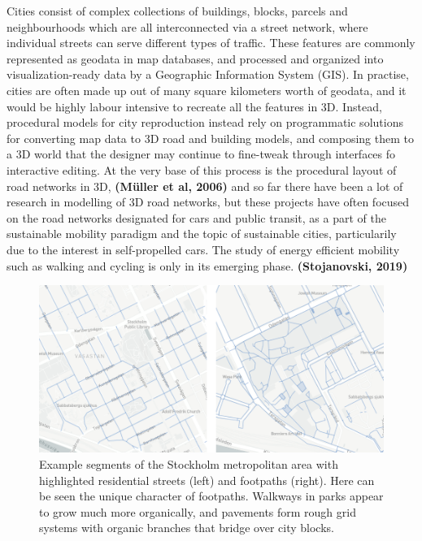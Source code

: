 \documentclass{kththesis}
\begin{document}
Cities consist of complex collections of buildings, blocks, parcels and neighbourhoods which are all interconnected via a street network, where individual streets can serve different types of traffic.
These features are commonly represented as geodata in map databases, and processed and organized into visualization-ready data by a Geographic Information System (GIS).
In practise, cities are often made up out of many square kilometers worth of geodata, and it would be highly labour intensive to recreate all the features in 3D.
Instead, procedural models for city reproduction instead rely on programmatic solutions for converting map data to 3D road and building models, and composing them to a 3D world that the designer may continue to fine-tweak through interfaces fo interactive editing.
At the very base of this process is the procedural layout of road networks in 3D,
\textbf{(Müller et al, 2006)}
and so far there have been a lot of research in modelling of 3D road networks, but these projects have often focused on the road networks designated for cars and public transit, as a part of the sustainable mobility paradigm and the topic of sustainable cities, particularily due to the interest in self-propelled cars.
The study of energy efficient mobility such as walking and cycling is only in its emerging phase. \textbf{(Stojanovski, 2019)}

\begin{figure}[H]
    \centering
    \includegraphics[width=\textwidth,height=0.5\textheight,keepaspectratio]{img_map_residential_footpath_compare}
    \caption{Example segments of the Stockholm metropolitan area with highlighted residential streets (left) and footpaths (right). Here can be seen the unique character of footpaths. Walkways in parks appear to grow much more organically, and pavements form rough grid systems with organic branches that bridge over city blocks.}
    \label{fig:residential-footpath-map}
\end{figure}
\end{document}
